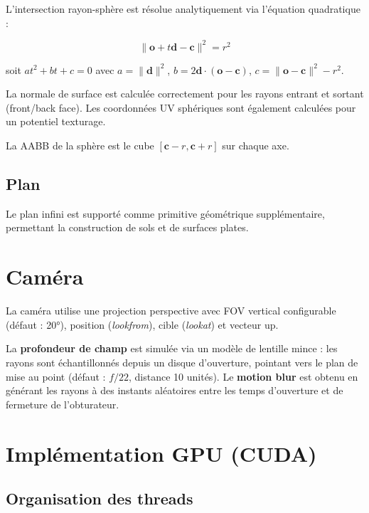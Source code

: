 \documentclass[12pt,a4paper]{article}
\begin{document}
L'intersection rayon-sphère est résolue analytiquement via l'équation quadratique :

\[
\|\bm{o} + t\bm{d} - \bm{c}\|^2 = r^2
\]

soit $at^2 + bt + c = 0$ avec $a = \|\bm{d}\|^2$,
$b = 2\bm{d} \cdot (\bm{o} - \bm{c})$,
$c = \|\bm{o} - \bm{c}\|^2 - r^2$.

La normale de surface est calculée correctement pour les rayons entrant et sortant
(front/back face). Les coordonnées UV sphériques sont également calculées pour
un potentiel texturage.

La AABB de la sphère est le cube $[\bm{c} - r, \bm{c} + r]$ sur chaque axe.

\subsection{Plan}

Le plan infini est supporté comme primitive géométrique supplémentaire,
permettant la construction de sols et de surfaces plates.

\section{Caméra}

La caméra utilise une projection perspective avec FOV vertical configurable (défaut : 20°),
position (\textit{lookfrom}), cible (\textit{lookat}) et vecteur up.

La \textbf{profondeur de champ} est simulée via un modèle de lentille mince :
les rayons sont échantillonnés depuis un disque d'ouverture, pointant vers le plan
de mise au point (défaut : $f/22$, distance 10 unités).
Le \textbf{motion blur} est obtenu en générant les rayons à des instants aléatoires
entre les temps d'ouverture et de fermeture de l'obturateur.

\section{Implémentation GPU (CUDA)}

\subsection{Organisation des threads}
\end{document}

